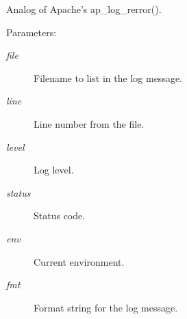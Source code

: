 Analog of Apache's ap\_\-log\_\-rerror(). \begin{Desc}
\item[Parameters: ]\par
\begin{description}
\item[{\em 
file}]Filename to list in the log message. \item[{\em 
line}]Line number from the file. \item[{\em 
level}]Log level. \item[{\em 
status}]Status code. \item[{\em 
env}]Current environment. \item[{\em 
fmt}]Format string for the log message. \end{description}
\end{Desc}
